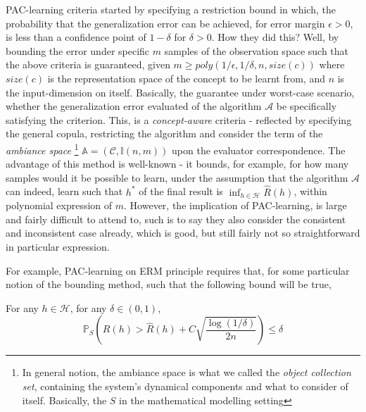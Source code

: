 \documentclass[10pt]{article} %
\begin{document}
PAC-learning criteria started by specifying a restriction bound in which, the probability that the generalization error can be achieved, for error margin $\epsilon > 0$, is less than a confidence point of $1-\delta$ for $\delta > 0$. How they did this? Well, by bounding the error under specific $m$ samples of the observation space such that the above criteria is guaranteed, given $m\geq poly(1/\epsilon, 1/\delta, n,size(c))$ where $size(c)$ is the representation space of the concept to be learnt from, and $n$ is the input-dimension on itself. Basically, the guarantee under worst-case scenario, whether the generalization error evaluated of the algorithm $\mathcal{A}$ be specifically satisfying the criterion. This, is a \textit{concept-aware} criteria - reflected by specifying the general copula, restricting the algorithm and consider the term of the \textit{ambiance space} \footnote{In general notion, the ambiance space is what we called the \textit{object collection set}, containing the system's dynamical components and what to consider of itself. Basically, the $S$ in the mathematical modelling setting} $\mathbb{A}=(\mathcal{C},\mathbb{I}(n,m))$ upon the evaluator correspondence. The advantage of this method is well-known - it bounds, for example, for how many samples would it be possible to learn, under the assumption that the algorithm $\mathcal{A}$ can indeed, learn such that $h^{*}$ of the final result is $\inf_{h\in\mathcal{H}}\hat{R}(h)$, within polynomial expression of $m$. However, the implication of PAC-learning, is large and fairly difficult to attend to, such is to say they also consider the consistent and inconsistent case already, which is good, but still fairly not so straightforward in particular expression. 

For example, PAC-learning on ERM principle requires that, for some particular notion of the bounding method, such that the following bound will be true, 


\begin{proposition}\label{prop:PAC_ERM_1_recite}
    For any $h\in\mathcal{H}$, for any $\delta\in(0,1)$, 
    \begin{equation}
        \mathbb{P}_{S}\left( R(h) > \hat{R}(h)+ C\sqrt{\frac{\log{(1/\delta)}}{2n}}\right)\leq \delta
    \end{equation}
\end{proposition}
\end{document}
